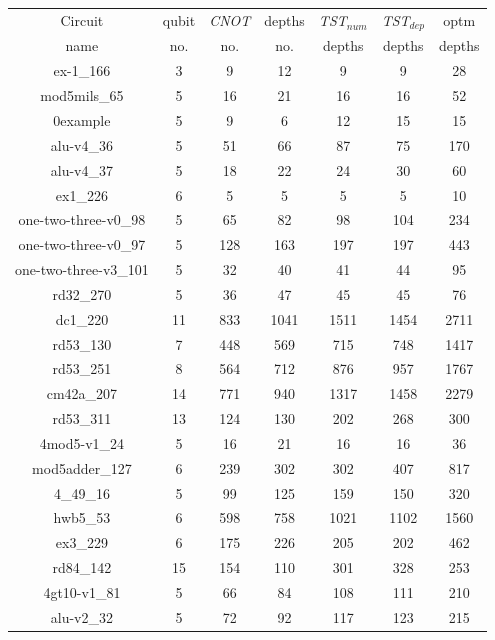 \documentclass[runningheads]{llncs}
\begin{document}
						\begin{table}[H]
							\begin{center}  
							\begin{tabular}{|c|c|c|c|c|c|c|}
							\hline
							Circuit &  qubit  & \textit{CNOT} &depths &\textit{TST$_{num}$}& \textit{TST$_{dep}$}  & optm 	  	\\
							 name	&   no. 	&	no. & no. & depths&  depths &  depths 	\\
							\hline
							ex-1\_166 & 3 & 9 & 12 & 9 & 9 & 28 \\
							mod5mils\_65 & 5 & 16 & 21 & 16 & 16 & 52 \\
							0example & 5 & 9 & 6 & 12 & 15 & 15 \\
							alu-v4\_36 & 5 & 51 & 66 & 87 & 75 & 170 \\
							alu-v4\_37 & 5 & 18 & 22 & 24 & 30 & 60 \\
							ex1\_226 & 6 & 5 & 5 & 5 & 5 & 10 \\
							one-two-three-v0\_98 & 5 & 65 & 82 & 98 & 104 & 234 \\
							one-two-three-v0\_97 & 5 & 128 & 163 & 197 & 197 & 443 \\
							one-two-three-v3\_101 & 5 & 32 & 40 & 41 & 44 & 95 \\
							rd32\_270 & 5 & 36 & 47 & 45 & 45 & 76 \\
							dc1\_220 & 11 & 833 & 1041 & 1511 & 1454 & 2711 \\
							rd53\_130 & 7 & 448 & 569 & 715 & 748 & 1417 \\
							rd53\_251 & 8 & 564 & 712 & 876 & 957 & 1767 \\
							cm42a\_207 & 14 & 771 & 940 & 1317 & 1458 & 2279 \\
							rd53\_311 & 13 & 124 & 130 & 202 & 268 & 300 \\
							4mod5-v1\_24 & 5 & 16 & 21 & 16 & 16 & 36 \\
							mod5adder\_127 & 6 & 239 & 302 & 302 & 407 & 817 \\
							4\_49\_16 & 5 & 99 & 125 & 159 & 150 & 320 \\
							hwb5\_53 & 6 & 598 & 758 & 1021 & 1102 & 1560 \\
							ex3\_229 & 6 & 175 & 226 & 205 & 202 & 462 \\
							rd84\_142 & 15 & 154 & 110 & 301 & 328 & 253 \\
							4gt10-v1\_81 & 5 & 66 & 84 & 108 & 111 & 210 \\
							alu-v2\_32 & 5 & 72 & 92 & 117 & 123 & 215 \\

\end{tabular}
\end{center}
\end{table}
\end{document}
